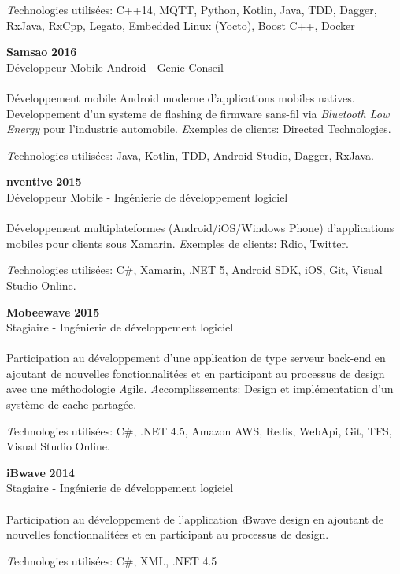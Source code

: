 \documentclass[margin,line]{res}
\begin{document}
\begin{resume}
  {\emph Technologies utilisées:} C++14, MQTT, Python, Kotlin, Java, TDD, Dagger, RxJava, RxCpp, Legato, Embedded Linux (Yocto), Boost C++, Docker

    {\bf Samsao} \hfill {\bf 2016}\\
  Développeur Mobile Android - Genie Conseil\\\\
  Développement mobile Android moderne d'applications mobiles natives. Developpement d'un systeme de flashing de firmware sans-fil via \emph{Bluetooth Low Energy} pour l'industrie automobile.
    {\emph Exemples de clients:} Directed Technologies.

    {\emph Technologies utilisées:} Java, Kotlin, TDD, Android Studio, Dagger, RxJava.

    {\bf nventive} \hfill {\bf 2015}\\
  Développeur Mobile - Ingénierie de développement logiciel\\\\
  Développement multiplateformes (Android/iOS/Windows Phone) d'applications mobiles pour clients sous Xamarin.
    {\emph Exemples de clients:} Rdio, Twitter.

    {\emph Technologies utilisées:} C\#, Xamarin, .NET 5, Android SDK, iOS, Git, Visual Studio Online.

    {\bf Mobeewave} \hfill {\bf 2015}\\
  Stagiaire - Ingénierie de développement logiciel\\\\
  Participation au développement d'une application de type serveur back-end en ajoutant de nouvelles fonctionnalitées et en participant au processus de design avec une méthodologie {\emph Agile}.
  {\emph Accomplissements:} Design et implémentation d'un système de cache partagée.

  {\emph Technologies utilisées:} C\#, .NET 4.5, Amazon AWS, Redis, WebApi, Git, TFS, Visual Studio Online.

    {\bf iBwave} \hfill {\bf 2014}\\
  Stagiaire - Ingénierie de développement logiciel\\\\
  Participation au développement de l'application {\emph iBwave design} en ajoutant de nouvelles fonctionnalitées et en participant au processus de design.

    {\emph Technologies utilisées:} C\#, XML, .NET 4.5



\end{resume}
\end{document}
